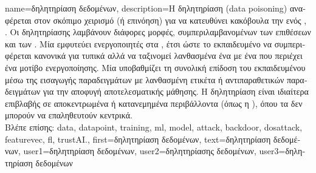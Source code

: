 {name={\foreignlanguage{greek}{δηλητηρίαση δεδομένων}}, 
 	description={\foreignlanguage{greek}{Η δηλητηρίαση}  
		(data poisoning) \foreignlanguage{greek}{αναφέρεται στον σκόπιμο χειρισμό (ή επινόηση)}  
		\foreignlanguage{greek}{για να κατευθύνει κακόβουλα την}  \foreignlanguage{greek}{ενός} 
		  \cite{Liu2021}, \cite{PoisonGAN}. 
  		\foreignlanguage{greek}{Οι}  \foreignlanguage{greek}{δηλητηρίασης}  
		\foreignlanguage{greek}{λαμβάνουν διάφορες μορφές, συμπεριλαμβανομένων των επιθέσεων}  
		\foreignlanguage{greek}{και των} . \foreignlanguage{greek}{Μία}  
		 \foreignlanguage{greek}{εμφυτεύει ενεργοποιητές στα}  , 
		\foreignlanguage{greek}{έτσι ώστε το εκπαιδευμένο}  \foreignlanguage{greek}{να συμπεριφέρεται 
		κανονικά για τυπικά}  \foreignlanguage{greek}{αλλά να ταξινομεί λανθασμένα ένα}
		 \foreignlanguage{greek}{με ένα}  \foreignlanguage{greek}{που 
		περιέχει ένα μοτίβο ενεργοποίησης. Μία}  \foreignlanguage{greek}{υποβαθμίζει 
		τη συνολική επίδοση του εκπαιδευμένου}  \foreignlanguage{greek}{μέσω της εισαγωγής 
		παραδειγμάτων με λανθασμένη ετικέτα ή αντιπαραθετικών παραδειγμάτων για την αποφυγή αποτελεσματικής 
		μάθησης. Η δηλητηρίαση}  \foreignlanguage{greek}{είναι ιδιαίτερα επιβλαβής 
		σε αποκεντρωμένα ή κατανεμημένα περιβάλλοντα}  \foreignlanguage{greek}{(όπως η} 
		), \foreignlanguage{greek}{όπου τα}  
		\foreignlanguage{greek}{δεν μπορούν να επαληθευτούν κεντρικά.} 
		\\
		\foreignlanguage{greek}{Βλέπε επίσης:} \gls{data}, \gls{datapoint}, \gls{training}, \gls{ml}, \gls{model}, \gls{attack}, 
		\gls{backdoor}, \gls{dosattack}, \gls{featurevec}, \gls{fl}, \gls{trustAI}.},
	first={\foreignlanguage{greek}{δηλητηρίαση δεδομένων}},
	text={\foreignlanguage{greek}{δηλητηρίαση δεδομένων}},
	user1={\foreignlanguage{greek}{δηλητηρίαση δεδομένων}}, %
    	user2={\foreignlanguage{greek}{δηλητηρίασης δεδομένων}}, %
	user3={\foreignlanguage{greek}{δηλητηρίαση δεδομένων}} %
}

